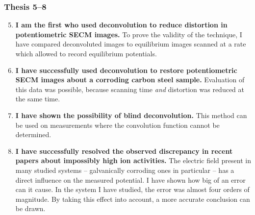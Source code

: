 \documentclass{beamer}
\begin{document}
\begin{frame}
\frametitle{Thesis 5--8}
\scriptsize
\begin{enumerate}
\setcounter{enumi}{4}
\item \textbf{I am the first who used deconvolution to reduce distortion in potentiometric SECM images.}
To prove the validity of the technique, I have compared deconvoluted images to equilibrium images scanned at a rate which allowed to record equilibrium potentials.

\item \textbf{I have successfully used deconvolution to restore potentiometric SECM images about a corroding carbon steel sample.}
Evaluation of this data was possible, because scanning time \emph{and} distortion was reduced at the same time.

\item \textbf{I have shown the possibility of blind deconvolution.}
This method can be used on measurements where the convolution function cannot be determined.

\item \textbf{I have successfully resolved the observed discrepancy in recent papers about impossibly high ion activities.}
The electric field present in many studied systems -- galvanically corroding ones in particular -- has a direct influence on the measured potential.
I have shown how big of an error can it cause.
In the system I have studied, the error was almost four orders of magnitude.
By taking this effect into account, a more accurate conclusion can be drawn.
\end{enumerate}
\end{frame}
\end{document}
